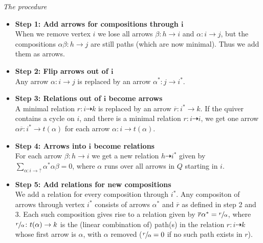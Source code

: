 \documentclass[12pt, dvipsnames, oneside]{amsart}
\theoremstyle{definition}
\begin{document}
\emph{The procedure}
\begin{itemize}
\item \textbf{Step 1: Add arrows for compositions through $\boldsymbol{i}$}\\
When we remove vertex $i$ we lose all arrows $\beta\colon h\rightarrow i$ and $\alpha\colon i\rightarrow j$, but the compositions $\alpha\beta\colon h\rightarrow j$ are still paths (which are now minimal). Thus we add them as arrows.\\

\item \textbf{Step 2: Flip arrows out of $\boldsymbol{i}$}\\
Any arrow $\alpha\colon i\rightarrow j$ is replaced by an arrow $\alpha^*\colon j\rightarrow i^*$.\\

\item \textbf{Step 3: Relations out of $\boldsymbol{i}$ become arrows}\\
A minimal relation $r\colon i\dashrightarrow k$ is replaced by an arrow $\overline{r}\colon i^*\rightarrow k$. If the quiver contains a cycle on $i$, and there is a minimal relation $r\colon i\dashrightarrow i$, we get one arrow $\alpha\overline{r}\colon i^*\rightarrow t(\alpha)$ for each arrow $\alpha\colon i \rightarrow t(\alpha)$.\\

\item \textbf{Step 4: Arrows into $\mathbf{i}$ become relations}\\
For each arrow $\beta\colon h\rightarrow i$ we get a new relation $h\dashrightarrow i^*$ given by ${\sum\limits_{\alpha\colon i\rightarrow ?} \alpha^*\alpha\beta=0}$, where $\alpha$ runs over all arrows in $Q$ starting in $i$. \\

\item \textbf{Step 5: Add relations for new compositions}\\
We add a relation for every composition through $i^*$.
Any compositon of arrows through vertex $i^*$ consists of arrows $\alpha^*$ and $\overline{r}$ as defined in step 2 and 3. Each such composition gives rise to a relation given by $\overline{r}\alpha^*=\sfrac{r}{\alpha}$, where $\sfrac{r}{\alpha}\colon t(\alpha)\rightarrow k$ is the (linear combination of) path(s) in the relation $r\colon i\dashrightarrow k$ whose first arrow is $\alpha$, with $\alpha$ removed ($\sfrac{r}{\alpha}=0$ if no such path exists in $r$).\\


\end{itemize}
\end{document}
